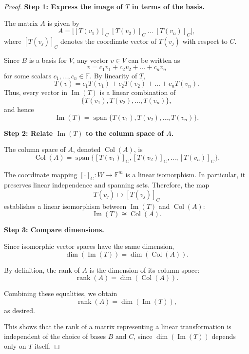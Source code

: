 \begin{proof}
\textbf{Step 1: Express the image of $T$ in terms of the basis.}

The matrix $A$ is given by
\[
A = \big[[T(v_1)]_C \; [T(v_2)]_C \; \dots \; [T(v_n)]_C\big],
\]
where $[T(v_j)]_C$ denotes the coordinate vector of $T(v_j)$ with respect to $C$.

Since $B$ is a basis for $V$, any vector $v \in V$ can be written as
\[
v = c_1 v_1 + c_2 v_2 + \dots + c_n v_n
\]
for some scalars $c_1, \dots, c_n \in \mathbb{F}$. By linearity of $T$,
\[
T(v) = c_1 T(v_1) + c_2 T(v_2) + \dots + c_n T(v_n).
\]
Thus, every vector in $\operatorname{Im}(T)$ is a linear combination of 
\[
\{T(v_1), T(v_2), \dots, T(v_n)\},
\]
and hence
\[
\operatorname{Im}(T) = \operatorname{span}\{T(v_1), T(v_2), \dots, T(v_n)\}.
\]

\textbf{Step 2: Relate $\operatorname{Im}(T)$ to the column space of $A$.}

The column space of $A$, denoted $\operatorname{Col}(A)$, is
\[
\operatorname{Col}(A) = \operatorname{span}\{[T(v_1)]_C, [T(v_2)]_C, \dots, [T(v_n)]_C\}.
\]

The coordinate mapping $[\cdot]_C : W \to \mathbb{F}^m$ is a linear isomorphism. In particular, it preserves linear independence and spanning sets. Therefore, the map
\[
T(v_j) \longmapsto [T(v_j)]_C
\]
establishes a linear isomorphism between $\operatorname{Im}(T)$ and $\operatorname{Col}(A)$:
\[
\operatorname{Im}(T) \cong \operatorname{Col}(A).
\]

\textbf{Step 3: Compare dimensions.}

Since isomorphic vector spaces have the same dimension,
\[
\dim(\operatorname{Im}(T)) = \dim(\operatorname{Col}(A)).
\]

By definition, the rank of $A$ is the dimension of its column space:
\[
\operatorname{rank}(A) = \dim(\operatorname{Col}(A)).
\]

Combining these equalities, we obtain
\[
\operatorname{rank}(A) = \dim(\operatorname{Im}(T)),
\]
as desired. 

This shows that the rank of a matrix representing a linear transformation is independent of the choice of bases $B$ and $C$, since $\dim(\operatorname{Im}(T))$ depends only on $T$ itself.
\end{proof}
